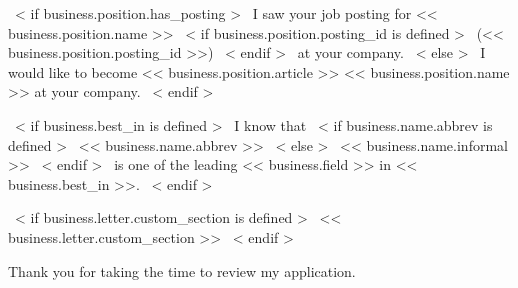 ~< if business.position.has_posting >~
    I saw your job posting for << business.position.name >>
    ~< if business.position.posting_id is defined >~ (<< business.position.posting_id >>) ~< endif >~ at your company.
~< else >~
    I would like to become << business.position.article >> << business.position.name >> at your company.
~< endif >~

~< if business.best_in is defined >~
    I know that
    ~< if business.name.abbrev is defined >~
        << business.name.abbrev >>
    ~< else >~
        << business.name.informal >>
    ~< endif >~
    is one of the leading << business.field >> in << business.best_in >>.
~< endif >~



~< if business.letter.custom_section is defined >~
  << business.letter.custom_section >>
~< endif >~

Thank you for taking the time to review my application.
